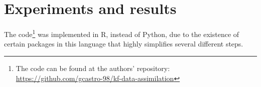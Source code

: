 \documentclass{article}
\theoremstyle{definition}
\theoremstyle{definition}
\theoremstyle{remark}
\theoremstyle{mythmstyle}
\begin{document}


\section{Experiments and results}\label{results}

The code\footnote{The code can be found at the authors' repository: \hyperlink{https://github.com/gcastro-98/kf-data-assimilation}{https://github.com/gcastro-98/kf-data-assimilation}} was implemented in R, instead of Python, due to the existence of certain packages in this language that highly simplifies several different steps. %
\end{document}
